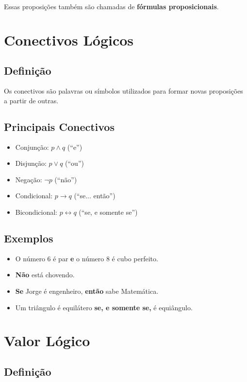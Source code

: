 Essas proposições também são chamadas de \textbf{fórmulas proposicionais}.

\section{Conectivos Lógicos}

\subsection{Definição}

Os conectivos são palavras ou símbolos utilizados para formar novas proposições a partir de outras.

\subsection{Principais Conectivos}

\begin{itemize}
    \item Conjunção: $p \land q$ (``e'')
    \item Disjunção: $p \lor q$ (``ou'')
    \item Negação: $\neg p$ (``não'')
    \item Condicional: $p \rightarrow q$ (``se... então'')
    \item Bicondicional: $p \leftrightarrow q$ (``se, e somente se'')
\end{itemize}

\subsection{Exemplos}

\begin{itemize}
    \item O número 6 é par \textbf{e} o número 8 é cubo perfeito.
    \item \textbf{Não} está chovendo.
    \item \textbf{Se} Jorge é engenheiro, \textbf{então} sabe Matemática.
    \item Um triângulo é equilátero \textbf{se, e somente se,} é equiângulo.
\end{itemize}

\section{Valor Lógico}

\subsection{Definição}

